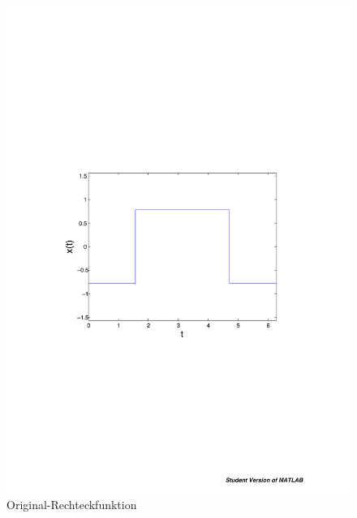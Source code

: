 \begin{refsection}
\begin{figure}
\begin{minipage}[hbt]{0.5\textwidth}
\centering
\includegraphics[width=1\textwidth]{kugel/Gibbs/Funktion.pdf}
\caption{Original-Rechteckfunktion}
\label{skript:Gibborg}
\end{minipage}
\hfill
\begin{minipage}[hbt]{0.5\textwidth}
\centering

\end{minipage}
\end{figure}
\end{refsection}

